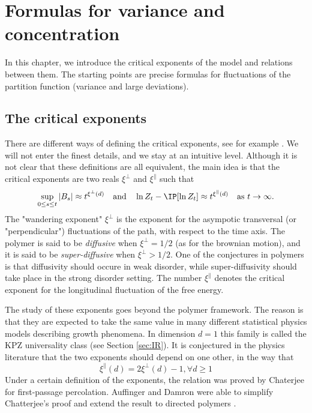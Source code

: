 \chapter{Formulas for variance and concentration}
In this chapter, we introduce the  critical exponents of the model and relations between them. The starting points are precise formulas for  fluctuations  of the partition function (variance and large deviations).
\section{The critical exponents}
 There are different ways of defining the critical exponents, see for example \cite{Chatterjee-scaling,LiceaNewPiza}. We will not enter the finest details, and we stay at an intuitive level.
 Although it is not clear that these definitions are all equivalent, the main idea is that the critical exponents are two reals $\xi^{\perp}$ and $\xi^{\parallel}$ such that
\begin{equation}
\sup_{0\leq s \leq t} |B_s| \approx t^{\xi^{\perp}(d)} \quad \text{and} \quad \ln Z_t - \IP[\ln Z_t] \approx t^{\xi^{\parallel}(d)} \quad \text{as} \  t\to\infty.
\end{equation}
The "wandering exponent" $\xi^{\perp}$ is the exponent for the asympotic transversal (or "perpendicular") fluctuations of the path, with respect to the time axis.
 The polymer is said to be \emph{diffusive} when $\xi^{\perp} = 1/2$ (as for the brownian motion), and it is said to be \emph{super-diffusive} when $\xi^{\perp} > 1/2$. One of the conjectures in polymers is that diffusivity should occure in weak disorder, while super-diffusivity should take place in the strong disorder setting. The number $\xi^{\parallel}$ denotes the critical exponent for the longitudinal fluctuation of the free energy.

The study of these exponents goes beyond the polymer framework. 
The reason is that they are expected to take the same value in many different  statistical physics models describing growth phenomena.  In dimension $d=1$ 
this family is called the KPZ universality class (see Section \ref{sec:IR}). It is conjectured in the physics literature \cite{KrugSpohn} that the two exponents should depend on one other, in the way that
\begin{equation}
\xi^{\parallel}(d) = 2 \xi^{\perp}(d) - 1, \forall d\geq 1
\end{equation}
Under a certain definition of the exponents, the relation was proved by Chaterjee \cite{Chatterjee-scaling} for first-passage percolation. Auffinger and Damron were able to simplify Chatterjee's proof and extend the result to directed polymers \cite{AuffingerDamron-sc,AuffingerDamron13}.

